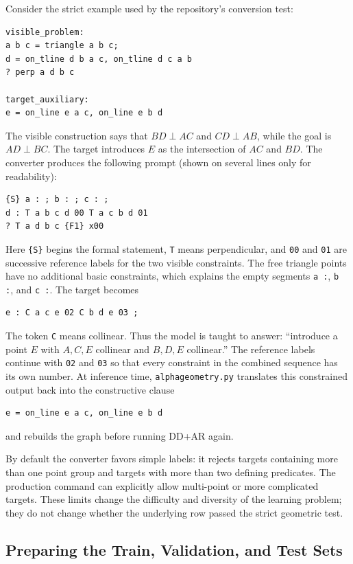 \documentclass[reqno]{amsart}
\DeclareMathOperator{\1}{\textbf{1}}
\begin{document}
Consider the strict example used by the repository's conversion test:
\begin{lstlisting}
visible_problem:
a b c = triangle a b c;
d = on_tline d b a c, on_tline d c a b
? perp a d b c

target_auxiliary:
e = on_line e a c, on_line e b d
\end{lstlisting}
The visible construction says that $BD\perp AC$ and $CD\perp AB$, while the
goal is $AD\perp BC$.  The target introduces $E$ as the intersection of $AC$
and $BD$.  The converter produces the following prompt (shown on several lines
only for readability):
\begin{lstlisting}
{S} a : ; b : ; c : ;
d : T a b c d 00 T a c b d 01
? T a d b c {F1} x00
\end{lstlisting}
Here \verb|{S}| begins the formal statement, \verb|T| means perpendicular, and
\verb|00| and \verb|01| are successive reference labels for the two visible
constraints.  The free triangle points have no additional basic constraints,
which explains the empty segments \verb|a :|, \verb|b :|, and \verb|c :|.
The target becomes
\begin{lstlisting}
e : C a c e 02 C b d e 03 ;
\end{lstlisting}
The token \verb|C| means collinear.  Thus the model is taught to answer:
``introduce a point $E$ with $A,C,E$ collinear and $B,D,E$ collinear.''  The
reference labels continue with \verb|02| and \verb|03| so that every constraint
in the combined sequence has its own number.  At inference time,
\verb|alphageometry.py| translates this constrained output back into the
constructive clause
\begin{lstlisting}
e = on_line e a c, on_line e b d
\end{lstlisting}
and rebuilds the graph before running DD+AR again.

By default the converter favors simple labels: it rejects targets containing
more than one point group and targets with more than two defining predicates.
The production command can explicitly allow multi-point or more complicated
targets.  These limits change the difficulty and diversity of the learning
problem; they do not change whether the underlying row passed the strict
geometric test.

\subsection{Preparing the Train, Validation, and Test Sets}
\end{document}
